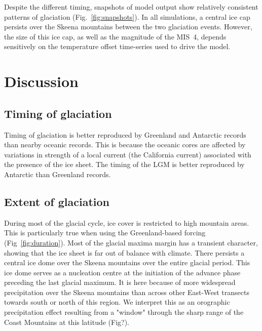 Despite the different timing,
snapshots of model output show relatively consistent patterns of glaciation
(Fig.~\ref{fig:snapshots}). In all simulations, a central ice cap persists over
the Skeena mountains between the two glaciation events. However, the size of
this ice cap, as well as the magnitude of the MIS~4, depends sensitively on the temperature
offset time-series used to drive the model.

\section{Discussion}
\label{sec:discussion}


\subsection{Timing of glaciation}

Timing of glaciation is better reproduced by Greenland and Antarctic records than
nearby oceanic records. This is because the oceanic cores are affected by
variations in strength of a local current (the California current) associated
with the presence of the ice sheet. The timing of the LGM is better reproduced
by Antarctic than Greenland records.

\subsection{Extent of glaciation}

During most of the glacial cycle, ice cover is restricted to high mountain
areas. This is particularly true when using the Greenland-based forcing
(Fig~\ref{fig:duration}). Most of the glacial maxima margin has a transient
character, showing that the ice sheet is far out of balance with climate. There
persists a central ice dome over the Skeena mountains over the entire glacial
period. This ice dome serves as a nucleation centre at the initiation of the
advance phase preceding the last glacial maximum. It is here because of more
widespread precipitation over the Skeena mountains than across other East-West
transects towards south or north of this region. We interpret this as an
orographic precipitation effect resulting from a "window" through the sharp
range of the Coast Mountains at this latitude (Fig?).

